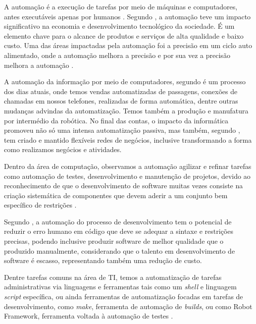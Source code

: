 \documentclass[tg]{mdtufsm}
\begin{document}
	A automação é a execução de tarefas por meio de máquinas e computadores, antes executáveis apenas por humanos \cite{automationlevels}.	Segundo \citeauthor{automation2009} \cite[pág. 124]{automation2009}, a automação teve um impacto significativo na economia e desenvolvimento tecnológico da sociedade. É um elemento chave para o alcance de produtos e serviços de alta qualidade e baixo custo. Uma das áreas impactadas pela automação foi a precisão em um ciclo auto alimentado, onde a automação melhora a precisão e por sua vez a precisão melhora a automação \cite{auto2008precision}.
	
	A automação da informação por meio de computadores, segundo \citeauthor{automation2009} \cite[pág. 3]{automation2009} é  um processo dos dias atuais, onde temos vendas automatizadas de passagens, conexões de chamadas em nossos telefones, realizadas de forma automática, dentre outras mudanças advindas da automatização. Temos também a produção e manufatura por intermédio da robótica. No final das contas, o impacto da informática promoveu não só uma intensa automatização passiva, mas também, segundo \citeauthor{itEnabledBusiness}\cite{itEnabledBusiness}, tem criado e mantido flexíveis redes de negócios, inclusive transformando a forma como realizamos negócios e atividades.
	
	Dentro da área de computação, observamos a automação agilizar e refinar tarefas como automação de testes, desenvolvimento e manutenção de projetos, devido ao reconhecimento de que o desenvolvimento de software muitas vezes consiste na criação sistemática de componentes que devem aderir a um conjunto bem específico de restrições \cite{automionSoftEvolutionEffect}.
	
	Segundo \citeauthor{automionSoftEvolutionEffect}\cite{automionSoftEvolutionEffect}, a automação do processo de desenvolvimento tem o potencial de reduzir o erro humano em código que deve se adequar a sintaxe e restrições precisas, podendo inclusive produzir software de melhor qualidade que o produzido manualmente, considerando que o talento em desenvolvimento de software é escasso, representando também uma redução de custo. 
	
	Dentre tarefas comuns na área de TI, temos a automatização de tarefas administrativas via linguagens e ferramentas tais como um \emph{shell} e linguagem \emph{script} específica, ou ainda ferramentas de automatização focadas em tarefas de desenvolvimento, como \emph{make}, ferramenta de automação de \emph{builds}, ou como Robot Framework, ferramenta voltada à automação de testes \cite{shell,make,robotFW}.
\end{document}
